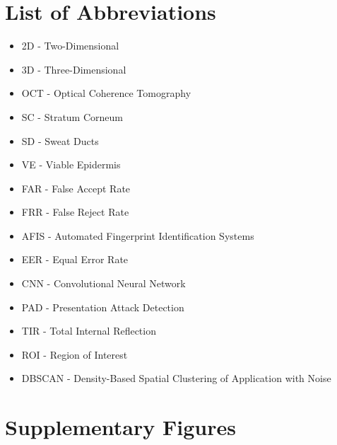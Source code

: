 \documentclass[12pt, twoside]{report}
\begin{document}
\chapter*{List of Abbreviations}
\begin{itemize}
    \item 2D - Two-Dimensional
    \item 3D - Three-Dimensional
    \item OCT - Optical Coherence Tomography
    \item SC - Stratum Corneum
    \item SD - Sweat Ducts
    \item VE - Viable Epidermis
    \item FAR - False Accept Rate
    \item FRR - False Reject Rate
    \item AFIS - Automated Fingerprint Identification Systems
    \item EER - Equal Error Rate
    \item CNN - Convolutional Neural Network
    \item PAD - Presentation Attack Detection
    \item TIR - Total Internal Reflection
    \item ROI - Region of Interest
    \item DBSCAN - Density-Based Spatial Clustering of Application with Noise
\end{itemize}
\clearpage
\setcounter{page}{1} 
\doublespacing






\printbibliography
\clearpage
\appendix
\chapter{Supplementary Figures}
\end{document}
